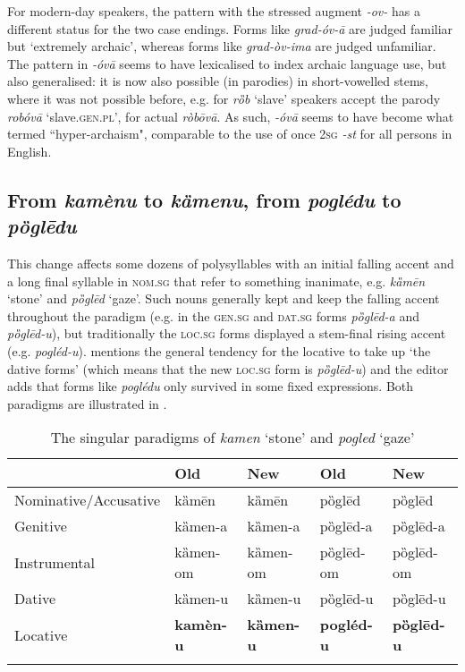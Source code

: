 \documentclass[output=paper,modfonts,nonflat
]{langsci/langscibook}
\begin{document}
For modern-day speakers, the pattern with the stressed augment \textit{-ov-} has a different status for the two case endings. Forms like \textit{grad-óv-ā} are judged familiar but `extremely archaic', whereas forms like \textit{grad-òv-ima} are judged unfamiliar. The pattern in \textit{-óvā} seems to have lexicalised to index archaic language use, but also generalised: it is now also possible (in parodies) in short-vowelled stems, where it was not possible before, e.g. for \textit{rȍb} `slave' speakers accept the parody \textit{robóvā} `slave.\textsc{gen}.\textsc{pl}', for actual \textit{ròbōvā}. As such, \textit{-óvā} seems to have become what \citet{Janda1994} termed ``hyper-archaism", comparable to the use of once 2\textsc{sg} \textit{-st} for all persons in English. 

\subsection{From \textit{kamènu} to \textit{kȁmenu}, from \textit{poglédu} to \textit{pȍglēdu}} \label{sec:kager:subsec24}
This change affects some dozens of polysyllables with an initial falling accent and a long final syllable in \textsc{nom}.\textsc{sg} that refer to something inanimate, e.g.\textit{ kȁmēn} `stone' and \textit{pȍglēd} `gaze'. Such nouns generally kept and keep the falling accent throughout the paradigm (e.g. in the  \textsc{gen}.\textsc{sg} and  \textsc{dat}.\textsc{sg} forms \textit{pȍglēd-a} and \textit{pȍglēd-u}), but traditionally the \textsc{loc}.\textsc{sg} forms displayed a stem-final rising accent (e.g. \textit{pogléd-u}). \citet[30]{Klaic2013} mentions the general tendency for the locative to take up `the dative forms' (which means that the new \textsc{loc}.\textsc{sg} form is \textit{pȍglēd-u}) and the editor adds that forms like \textit{poglédu} only survived in some fixed expressions. Both paradigms are illustrated in .

\begin{table}
\caption{The singular paradigms of \textit{kamen} `stone' and \textit{pogled} `gaze'}
\label{tab:kager:5}
 \begin{tabular}{  l l l l l }
  \lsptoprule
& Old & New & Old & New\\ 
 \midrule
 Nominative/Accusative  &  kȁmēn  &  kȁmēn&  pȍglēd &  pȍglēd \\
Genitive  &  kȁmen-a  &  kȁmen-a &  pȍglēd-a &  pȍglēd-a \\  
Instrumental  &  kȁmen-om  &  kȁmen-om &  pȍglēd-om &  pȍglēd-om \\  
Dative  &  kȁmen-u  &  kȁmen-u &  pȍglēd-u &  pȍglēd-u \\  
Locative  & \textbf{kamèn-u} &  \textbf{kȁmen-u} &  \textbf{pogléd-u} &  \textbf{pȍglēd-u} \\
  \lspbottomrule
 \end{tabular}
\end{table}
\end{document}
